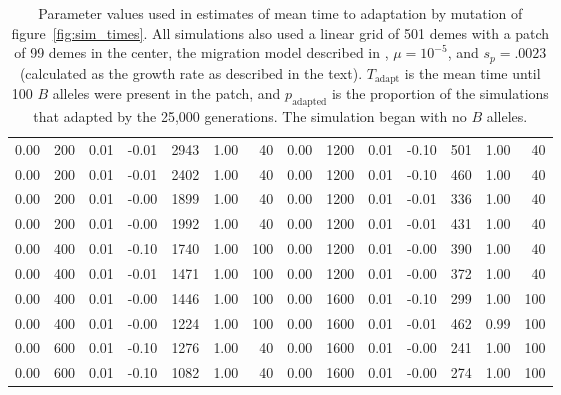 \begin{table}[ht]
{\begin{tabular}{|rrrrrrr||rrrrrrr|}
  0.00 & 200 & 0.01 & -0.01 & 2943 & 1.00 & 40 & 0.00 & 1200 & 0.01 & -0.10 & 501 & 1.00 & 40 \\ 
  0.00 & 200 & 0.01 & -0.01 & 2402 & 1.00 & 40 & 0.00 & 1200 & 0.01 & -0.10 & 460 & 1.00 & 40 \\ 
  0.00 & 200 & 0.01 & -0.00 & 1899 & 1.00 & 40 & 0.00 & 1200 & 0.01 & -0.01 & 336 & 1.00 & 40 \\ 
  0.00 & 200 & 0.01 & -0.00 & 1992 & 1.00 & 40 & 0.00 & 1200 & 0.01 & -0.01 & 431 & 1.00 & 40 \\ 
  0.00 & 400 & 0.01 & -0.10 & 1740 & 1.00 & 100 & 0.00 & 1200 & 0.01 & -0.00 & 390 & 1.00 & 40 \\ 
  0.00 & 400 & 0.01 & -0.01 & 1471 & 1.00 & 100 & 0.00 & 1200 & 0.01 & -0.00 & 372 & 1.00 & 40 \\ 
  0.00 & 400 & 0.01 & -0.00 & 1446 & 1.00 & 100 & 0.00 & 1600 & 0.01 & -0.10 & 299 & 1.00 & 100 \\ 
  0.00 & 400 & 0.01 & -0.00 & 1224 & 1.00 & 100 & 0.00 & 1600 & 0.01 & -0.01 & 462 & 0.99 & 100 \\ 
  0.00 & 600 & 0.01 & -0.10 & 1276 & 1.00 & 40 & 0.00 & 1600 & 0.01 & -0.00 & 241 & 1.00 & 100 \\ 
  0.00 & 600 & 0.01 & -0.10 & 1082 & 1.00 & 40 & 0.00 & 1600 & 0.01 & -0.00 & 274 & 1.00 & 100 \\ 
   \hline
\end{tabular}
}
\caption{
            Parameter values used in estimates of mean time to adaptation by mutation of figure~\ref{fig:sim_times}.
            All simulations also used a linear grid of 501 demes with a patch of 99 demes in the center, 
            the migration model described in ,
            $\mu=10^{-5}$, and $s_p=.0023$ (calculated as the growth rate as described in the text).
            $T_\text{adapt}$ is the mean time until 100 $B$ alleles were present in the patch,
            and $p_\text{adapted}$ is the proportion of the simulations that adapted by the 25,000 generations.
            The simulation began with no $B$ alleles.
            } 
\label{stab:mutation_params}
\end{table}
